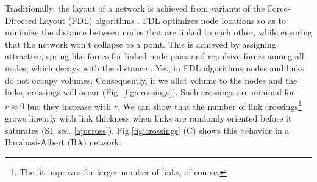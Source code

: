 \documentclass[nofootinbib,preprint,floatfix]{revtex4} %
\begin{document}
Traditionally, the layout of a network is achieved from variants of the Force-Directed Layout (FDL) algorithms \cite{kamada1989algorithm,davidson1996drawing,fruchterman1991graph,barnes1986hierarchical}. 
FDL optimizes node locations so as to minimize the distance between nodes that are linked to each other, while ensuring that the network won't collapse to a point. 
This is achieved by assigning attractive, spring-like forces for linked node pairs and repulsive forces among all nodes, which decays with the distance %
 \cite{kabourov2015spring}.
Yet, in FDL algorithms nodes and links do not occupy volumes. Consequently, if we allot volume to the nodes and the links, crossings will occur (Fig. \ref{fig:crossings}). Such crossings are minimal for $r\approx 0$ but they increase with $r$.
We can show that the number of link crossings\footnote{
The fit improves for larger number of links, of course.} grows linearly with link thickness when links are randomly oriented before it saturates (SI, sec. \ref{ap:cross}). 
Fig.\ref{fig:crossings} (C) shows this behavior in a Barabasi-Albert (BA) network.%
%
\end{document}
